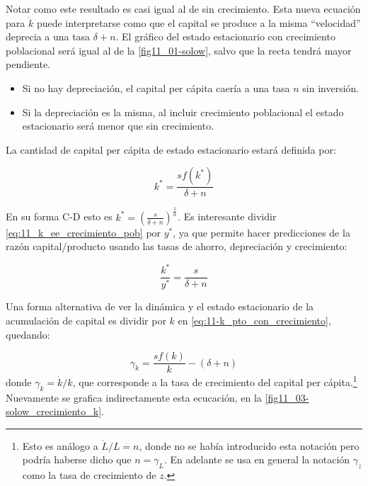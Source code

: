 \documentclass[DeGregorioResumen]{subfiles}
\begin{document}
Notar como este resultado es casi igual al de sin crecimiento. Esta nueva ecuación para $\dot k$ puede interpretarse como que el capital se produce a la misma ``velocidad'' deprecia a una tasa $\delta + n$. El gráfico del estado estacionario con crecimiento poblacional será igual al de la \autoref{fig11_01-solow}, salvo que la recta tendrá mayor pendiente.

\begin{itemize}
\item Si no hay depreciación, el capital per cápita caería a una tasa $n$ sin inversión.
\item Si la depreciación es la misma, al incluir crecimiento poblacional el estado estacionario será menor que sin crecimiento.
\end{itemize}

La cantidad de capital per cápita de estado estacionario estará definida por:

\begin{equation}
k^*=\frac{sf(k^*)}{\delta+n}
\label{eq:11_k_ee_crecimiento_pob}
\end{equation}

En su forma C-D esto es $\displaystyle k^* = \left(\frac{s}{\delta + n}\right)^{\frac{1}{\alpha}}$. Es interesante dividir \eqref{eq:11_k_ee_crecimiento_pob} por $y^*$, ya que permite hacer predicciones de la razón capital/producto usando las tasas de ahorro, depreciación y crecimiento:

\begin{equation}
\frac{k^*}{y^*}= \frac{s}{\delta + n}
\end{equation}

Una forma alternativa de ver la dinámica y el estado estacionario de la acumulación de capital es dividir por $k$ en \eqref{eq:11-k_pto_con_crecimiento}, quedando:

\begin{equation}
\gamma_k = \frac{sf(k)}{k}-(\delta + n)
\end{equation}
donde $\gamma_k = \dot k/k$, que corresponde a la tasa de crecimiento del capital per cápita.\footnote{Esto es análogo a $\dot L/L = n$, donde no se había introducido esta notación pero podría haberse dicho que $n=\gamma_L$. En adelante se usa en general la notación $\gamma_z$ como la tasa de crecimiento de $z$.} Nuevamente se grafica indirectamente esta ecucación, en la \autoref{fig11_03-solow_crecimiento_k}.


\end{document}
